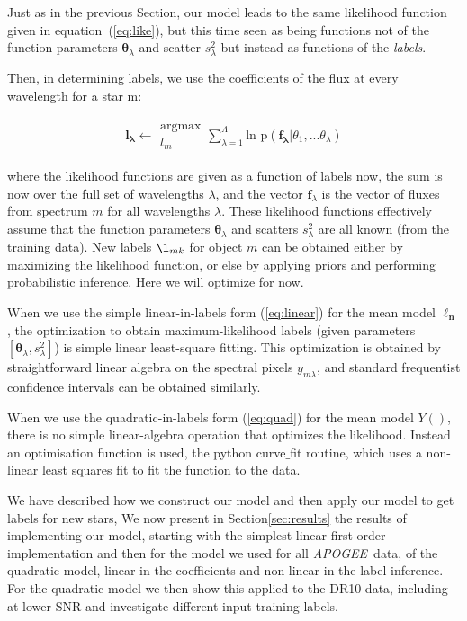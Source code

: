 \documentclass[12pt, preprint]{aastex}
\newcommand{\sectionname}{Section}
\newcommand{\set}[1]{\bm{#1}}
\newcommand{\apogee}{\textsl{APOGEE}}
\begin{document}
Just as in the previous \sectionname, our model leads to the same likelihood function given in
equation~(\ref{eq:like}), but this time seen as
being functions not of the function parameters $\set{\theta}_\lambda$ and
scatter $s_\lambda^2$ but instead as functions of the \emph{labels}.

Then, in determining labels, we use the coefficients of the flux at every wavelength for a star m: 

\begin{eqnarray}
\set{l_\lambda} \leftarrow \substack{\mbox{argmax}\\
{l_m}  }
\sum_{\lambda=1}^\Lambda \mbox{ln p}(\set{f_\lambda} | {\theta_1,...\theta_\lambda})
\end{eqnarray}

where the likelihood functions are given as a function of labels now,
the sum is now over the full set of wavelengths
$\lambda$, and the vector $\set{f}_\lambda$ is the vector of fluxes from
spectrum $m$ for all wavelengths $\lambda$.
These likelihood functions effectively assume that the function
parameters $\set{\theta}_\lambda$ and scatters $s_\lambda^2$ are all known (from
the training data).
New labels $\l_{mk}$ for object $m$ can be obtained either by maximizing
the likelihood function, or else by applying priors
and performing probabilistic inference.
Here we will optimize for now.

When we use the simple linear-in-labels form (\ref{eq:linear}) for the
mean model $\set{\ell_n}$, the optimization to obtain maximum-likelihood labels
(given parameters $[\set{\theta}_\lambda, s_\lambda^2]$) is simple linear
least-square fitting.
This optimization is obtained by straightforward linear algebra on the
spectral pixels $y_{m\lambda}$, and standard frequentist confidence
intervals can be obtained similarly.

When we use the quadratic-in-labels form (\ref{eq:quad}) for the
mean model $Y()$, there is no simple linear-algebra operation that
optimizes the likelihood. Instead an optimisation function is used, the python curve$\_$fit routine, which uses a non-linear least squares fit to fit the function to the data. 

We have described how we construct our model and then apply our model to get labels for new stars, We now present in Section\ref{sec:results} the results of implementing our model, starting with the simplest linear first-order implementation and then for the model we used for all \apogee\ data, of the quadratic model, linear in the coefficients and non-linear in the label-inference.  For the quadratic model we then show this applied to the DR10 data, including at lower SNR and investigate different input training labels. 
\end{document}
